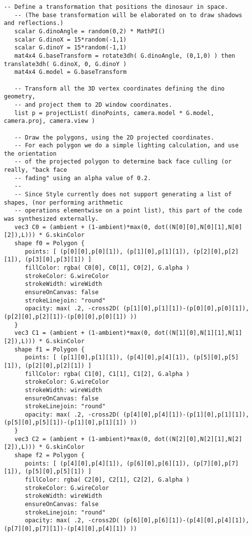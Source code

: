 \begin{lstlisting}[language=Sty-RT,escapechar=@]
   -- Define a transformation that positions the dinosaur in space.
   -- (The base transformation will be elaborated on to draw shadows and reflections.)
   scalar G.dinoAngle = random(0,2) * MathPI()
   scalar G.dinoX = 15*random(-1,1)
   scalar G.dinoY = 15*random(-1,1)
   mat4x4 G.baseTransform = rotate3dh( G.dinoAngle, (0,1,0) ) then translate3dh( G.dinoX, 0, G.dinoY )
   mat4x4 G.model = G.baseTransform

   -- Transform all the 3D vertex coordinates defining the dino geometry,
   -- and project them to 2D window coordinates.
   list p = projectList( dinoPoints, camera.model * G.model, camera.proj, camera.view )

   -- Draw the polygons, using the 2D projected coordinates.
   -- For each polygon we do a simple lighting calculation, and use the orientation
   -- of the projected polygon to determine back face culling (or really, "back face
   -- fading" using an alpha value of 0.2.
   --
   -- Since Style currently does not support generating a list of shapes, (nor performing arithmetic
   -- operations elementwise on a point list), this part of the code was synthesized externally.
   vec3 C0 = (ambient + (1-ambient)*max(0, dot((N[0][0],N[0][1],N[0][2]),L))) * G.skinColor
   shape f0 = Polygon {
      points: [ (p[0][0],p[0][1]), (p[1][0],p[1][1]), (p[2][0],p[2][1]), (p[3][0],p[3][1]) ]
      fillColor: rgba( C0[0], C0[1], C0[2], G.alpha )
      strokeColor: G.wireColor
      strokeWidth: wireWidth
      ensureOnCanvas: false
      strokeLinejoin: "round"
      opacity: max( .2, -cross2D( (p[1][0],p[1][1])-(p[0][0],p[0][1]), (p[2][0],p[2][1])-(p[0][0],p[0][1]) ))
   }
   vec3 C1 = (ambient + (1-ambient)*max(0, dot((N[1][0],N[1][1],N[1][2]),L))) * G.skinColor
   shape f1 = Polygon {
      points: [ (p[1][0],p[1][1]), (p[4][0],p[4][1]), (p[5][0],p[5][1]), (p[2][0],p[2][1]) ]
      fillColor: rgba( C1[0], C1[1], C1[2], G.alpha )
      strokeColor: G.wireColor
      strokeWidth: wireWidth
      ensureOnCanvas: false
      strokeLinejoin: "round"
      opacity: max( .2, -cross2D( (p[4][0],p[4][1])-(p[1][0],p[1][1]), (p[5][0],p[5][1])-(p[1][0],p[1][1]) ))
   }
   vec3 C2 = (ambient + (1-ambient)*max(0, dot((N[2][0],N[2][1],N[2][2]),L))) * G.skinColor
   shape f2 = Polygon {
      points: [ (p[4][0],p[4][1]), (p[6][0],p[6][1]), (p[7][0],p[7][1]), (p[5][0],p[5][1]) ]
      fillColor: rgba( C2[0], C2[1], C2[2], G.alpha )
      strokeColor: G.wireColor
      strokeWidth: wireWidth
      ensureOnCanvas: false
      strokeLinejoin: "round"
      opacity: max( .2, -cross2D( (p[6][0],p[6][1])-(p[4][0],p[4][1]), (p[7][0],p[7][1])-(p[4][0],p[4][1]) ))

\end{lstlisting}
